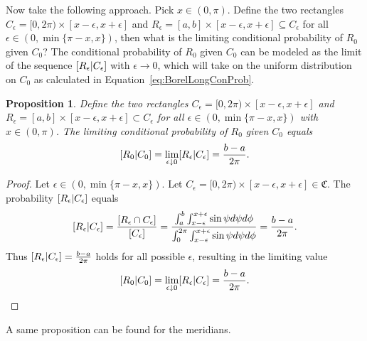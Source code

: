 \documentclass[a4paper]{report}
\theoremstyle{plain}
\newtheorem{proposition}[theorem]{Proposition}
\theoremstyle{definition}
\theoremstyle{remark}
\numberwithin{equation}{chapter}
\let\P\relax
\DeclareMathOperator{\P}{\mathbb{P}}
\DeclareMathOperator{\1}{\mathbbm{1}}
\begin{document}
Now take the following approach. Pick $x\in(0,\pi)$. Define the two rectangles $C_\epsilon=[0,2\pi)\times[x-\epsilon,x+\epsilon]$ and $R_\epsilon=[a,b]\times[x-\epsilon,x+\epsilon]\subseteq C_\epsilon$ for all ${\epsilon\in(0,\min\{\pi-x,x\})}$, then what is the limiting conditional probability of $R_0$ given $C_0$? The conditional probability of $R_0$ given $C_0$ can be modeled as the limit of the sequence $\P[R_\epsilon|C_\epsilon]$ with $\epsilon\to0$, which will take on the uniform distribution on $C_0$ as calculated in Equation~\ref{eq:BorelLongConProb}.
\begin{proposition}\label{prop:BorelLongBayes}
Define the two rectangles $C_\epsilon=[0,2\pi)\times[x-\epsilon,x+\epsilon]$ and $R_\epsilon=[a,b]\times[x-\epsilon,x+\epsilon]\subset C_\epsilon$ for all $\epsilon\in(0,\min\{\pi-x,x\})$ with $x\in(0,\pi)$. The limiting conditional probability of $R_0$ given $C_0$ equals
\begin{equation}
\P[R_0|C_0]=\lim_{\epsilon\downarrow0}\P[R_\epsilon|C_\epsilon]=\frac{b-a}{2\pi}.
\end{equation}
\end{proposition}
\begin{proof}
Let $\epsilon\in(0,\min\{\pi-x,x\})$. Let $C_\epsilon=[0,2\pi)\times[x-\epsilon,x+\epsilon]\in\mathfrak{C}$. The probability $\P[R_\epsilon|C_\epsilon]$ equals
\begin{equation}
\P[R_\epsilon|C_\epsilon]=\frac{\P[R_\epsilon\cap C_\epsilon]}{\P[C_\epsilon]}=\frac{\int_{a}^{b}\int_{x-\epsilon}^{x+\epsilon}\sin\psi d\psi d\phi}{\int_{0}^{2\pi}\int_{x-\epsilon}^{x+\epsilon}\sin\psi d\psi d\phi}=\frac{b-a}{2\pi}.
\end{equation}
Thus $\P[R_\epsilon|C_\epsilon]=\frac{b-a}{2\pi}$ holds for all possible $\epsilon$, resulting in the limiting value
\begin{equation}
\P[R_0|C_0]=\lim_{\epsilon\downarrow0}\P[R_\epsilon|C_\epsilon]=\frac{b-a}{2\pi}.
\end{equation}
\end{proof}

A same proposition can be found for the meridians.
\end{document}
